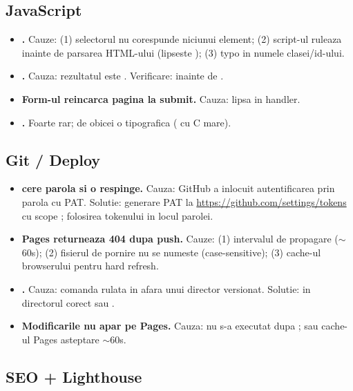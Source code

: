 \subsection*{JavaScript}

\begin{itemize}[itemsep=4pt]
  \item \textbf{.} Cauze: (1) selectorul nu corespunde niciunui element; (2) script-ul ruleaza inainte de parsarea HTML-ului (lipseste ); (3) typo in numele clasei/id-ului.
  \item \textbf{.} Cauza: rezultatul  este . Verificare:  inainte de .
  \item \textbf{Form-ul reincarca pagina la submit.} Cauza: lipsa  in handler.
  \item \textbf{.} Foarte rar; de obicei o tipografica ( cu C mare).
\end{itemize}

\subsection*{Git / Deploy}

\begin{itemize}[itemsep=4pt]
  \item \textbf{ cere parola si o respinge.} Cauza: GitHub a inlocuit autentificarea prin parola cu PAT. Solutie: generare PAT la \url{https://github.com/settings/tokens} cu scope ; folosirea tokenului in locul parolei.
  \item \textbf{Pages returneaza 404 dupa push.} Cauze: (1) intervalul de propagare ($\sim$60s); (2) fisierul de pornire nu se numeste  (case-sensitive); (3) cache-ul browserului \textendash{}  pentru hard refresh.
  \item \textbf{.} Cauza: comanda rulata in afara unui director versionat. Solutie:  in directorul corect sau .
  \item \textbf{Modificarile nu apar pe Pages.} Cauza: nu s-a executat  dupa ; sau cache-ul Pages \textendash{} asteptare $\sim$60s.
\end{itemize}

\subsection*{SEO + Lighthouse}

